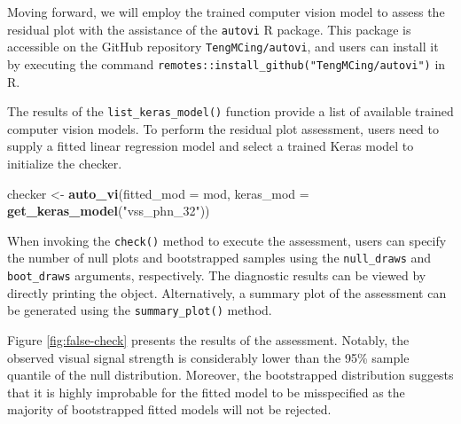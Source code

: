 \documentclass[]{interact}
\theoremstyle{plain}%
\theoremstyle{definition}
\theoremstyle{remark}
\newenvironment{Shaded}{\begin{snugshade}}{\end{snugshade}}
\newcommand{\AttributeTok}[1]{\textcolor[rgb]{0.13,0.29,0.53}{#1}}
\newcommand{\DataTypeTok}[1]{\textcolor[rgb]{0.13,0.29,0.53}{#1}}
\newcommand{\DecValTok}[1]{\textcolor[rgb]{0.00,0.00,0.81}{#1}}
\newcommand{\FunctionTok}[1]{\textcolor[rgb]{0.13,0.29,0.53}{\textbf{#1}}}
\newcommand{\NormalTok}[1]{#1}
\newcommand{\OtherTok}[1]{\textcolor[rgb]{0.56,0.35,0.01}{#1}}
\newcommand{\SpecialCharTok}[1]{\textcolor[rgb]{0.81,0.36,0.00}{\textbf{#1}}}
\newcommand{\StringTok}[1]{\textcolor[rgb]{0.31,0.60,0.02}{#1}}
\begin{document}
Moving forward, we will employ the trained computer vision model to
assess the residual plot with the assistance of the \texttt{autovi} R
package. This package is accessible on the GitHub repository
\texttt{TengMCing/autovi}, and users can install it by executing the
command \texttt{remotes::install\_github("TengMCing/autovi")} in R.

The results of the \texttt{list\_keras\_model()} function provide a list
of available trained computer vision models. To perform the residual
plot assessment, users need to supply a fitted linear regression model
and select a trained Keras model to initialize the checker.

\begin{Shaded}
\begin{Highlighting}[]
\NormalTok{checker }\OtherTok{\textless{}{-}} \FunctionTok{auto\_vi}\NormalTok{(}\AttributeTok{fitted\_mod =}\NormalTok{ mod, }
                   \AttributeTok{keras\_mod =} \FunctionTok{get\_keras\_model}\NormalTok{(}\StringTok{"vss\_phn\_32"}\NormalTok{))}
\end{Highlighting}
\end{Shaded}

When invoking the \texttt{check()} method to execute the assessment,
users can specify the number of null plots and bootstrapped samples
using the \texttt{null\_draws} and \texttt{boot\_draws} arguments,
respectively. The diagnostic results can be viewed by directly printing
the object. Alternatively, a summary plot of the assessment can be
generated using the \texttt{summary\_plot()} method.

\begin{Shaded}
\end{Shaded}

Figure \ref{fig:false-check} presents the results of the assessment.
Notably, the observed visual signal strength is considerably lower than
the 95\% sample quantile of the null distribution. Moreover, the
bootstrapped distribution suggests that it is highly improbable for the
fitted model to be misspecified as the majority of bootstrapped fitted
models will not be rejected.
\end{document}
